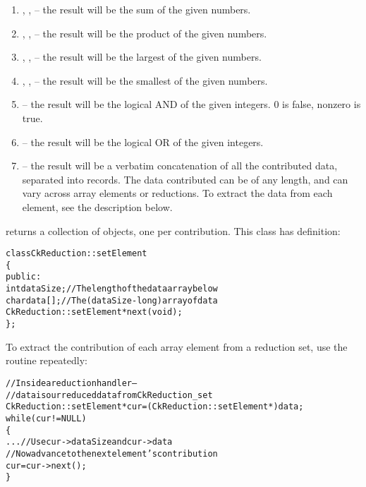 \begin{enumerate}

\item {}, , -- the
result will be the sum of the given numbers.

\item {}, ,
-- the result will be the product of the given numbers.

\item {}, , -- the
result will be the largest of the given numbers.

\item {}, , -- the
result will be the smallest of the given numbers.

\item {}-- the result will be the logical AND of the given
integers.  0 is false, nonzero is true.

\item {}-- the result will be the logical OR of the given
integers.

\item {}-- the result will be a verbatim concatenation of
all the contributed data, separated into  records.
The data contributed can be of any length, and can vary across array elements
or reductions.  To extract the data from each element, see the description
below.

\end{enumerate}


 returns a collection of 
objects, one per contribution.  This class has definition:

\begin{alltt}
class CkReduction::setElement 
\{
public:
  int dataSize;//The length of the data array below
  char data[];//The (dataSize-long) array of data
  CkReduction::setElement *next(void);
\};
\end{alltt}

To extract the contribution of each array element from a reduction set, use the
 routine repeatedly:

\begin{alltt}
  //Inside a reduction handler-- 
  //  data is our reduced data from CkReduction_set
  CkReduction::setElement *cur=(CkReduction::setElement *)data;
  while (cur!=NULL)
  \{
    ... //Use cur->dataSize and cur->data
    //Now advance to the next element's contribution
    cur=cur->next();
  \}
\end{alltt}

